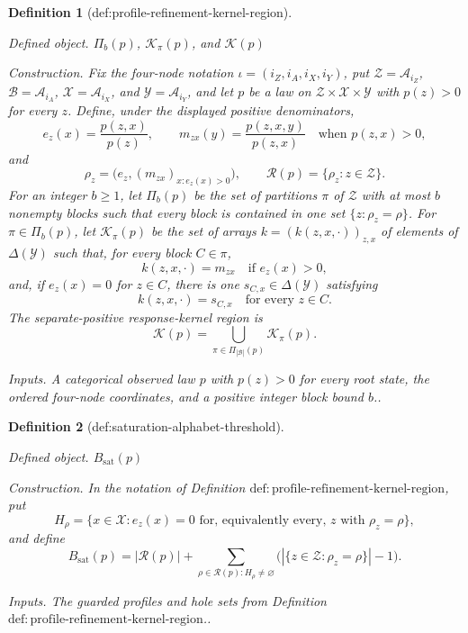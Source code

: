 \documentclass{article}
\newtheorem{definition}{Definition}
\begin{document}
\begin{definition}[def:profile-refinement-kernel-region]\label{def:profile-refinement-kernel-region}
\par\smallskip\noindent\emph{Defined object.} \(\Pi_b(p)\), \(\mathcal K_\pi(p)\), and \(\mathcal K(p)\)
\par\smallskip\noindent\emph{Construction.} Fix the four-node notation \(\iota=(i_Z,i_A,i_X,i_Y)\), put
\(\mathcal Z=\mathcal A_{i_Z}\), \(\mathcal B=\mathcal A_{i_A}\),
\(\mathcal X=\mathcal A_{i_X}\), and
\(\mathcal Y=\mathcal A_{i_Y}\), and let \(p\) be a law on
\(\mathcal Z\times\mathcal X\times\mathcal Y\) with \(p(z)>0\) for every
\(z\).  Define, under the displayed positive denominators,
\[
 e_z(x)=\frac{p(z,x)}{p(z)},
 \qquad
 m_{zx}(y)=\frac{p(z,x,y)}{p(z,x)}\quad\text{when }p(z,x)>0,
\]
and
\[
 \rho_z=\bigl(e_z,(m_{zx})_{x:e_z(x)>0}\bigr),
 \qquad
 \mathcal R(p)=\{\rho_z:z\in\mathcal Z\}.
\]
For an integer \(b\geq1\), let \(\Pi_b(p)\) be the set of partitions
\(\pi\) of \(\mathcal Z\) with at most \(b\) nonempty blocks such that
every block is contained in one set \(\{z:\rho_z=\rho\}\).  For
\(\pi\in\Pi_b(p)\), let \(\mathcal K_\pi(p)\) be the set of arrays
\(k=(k(z,x,\cdot))_{z,x}\) of elements of \(\Delta(\mathcal Y)\) such
that, for every block \(C\in\pi\),
\[
 k(z,x,\cdot)=m_{zx}\quad\text{if }e_z(x)>0,
\]
and, if \(e_z(x)=0\) for \(z\in C\), there is one
\(s_{C,x}\in\Delta(\mathcal Y)\) satisfying
\[
 k(z,x,\cdot)=s_{C,x}\quad\text{for every }z\in C.
\]
The separate-positive response-kernel region is
\[
 \mathcal K(p)=
 \bigcup_{\pi\in\Pi_{|\mathcal B|}(p)}\mathcal K_\pi(p).
\]
\par\smallskip\noindent\emph{Inputs.} A categorical observed law \(p\) with \(p(z)>0\) for every root state, the ordered four-node coordinates, and a positive integer block bound \(b\)..
\end{definition}

\begin{definition}[def:saturation-alphabet-threshold]\label{def:saturation-alphabet-threshold}
\par\smallskip\noindent\emph{Defined object.} \(B_{\mathrm{sat}}(p)\)
\par\smallskip\noindent\emph{Construction.} In the notation of
Definition \(\mathrm{def:profile\text{-}refinement\text{-}kernel\text{-}region}\),
put
\[
 H_\rho=\{x\in\mathcal X:e_z(x)=0\text{ for, equivalently every, }
 z\text{ with }\rho_z=\rho\},
\]
and define
\[
 B_{\mathrm{sat}}(p)
 =|\mathcal R(p)|+
 \sum_{\rho\in\mathcal R(p):H_\rho\ne\varnothing}
 \bigl(|\{z\in\mathcal Z:\rho_z=\rho\}|-1\bigr).
\]
\par\smallskip\noindent\emph{Inputs.} The guarded profiles and hole sets from Definition \(\mathrm{def:profile\text{-}refinement\text{-}kernel\text{-}region}\)..
\end{definition}
\end{document}
